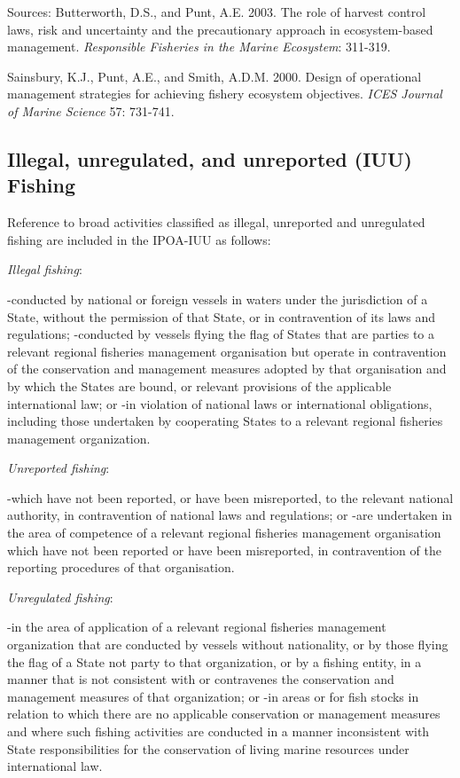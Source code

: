 \documentclass[
  11pt,
]{book}
\begin{document}
Sources: Butterworth, D.S., and Punt, A.E. 2003. The role of harvest control laws, risk and uncertainty and the precautionary approach in ecosystem-based management. \emph{Responsible Fisheries in the Marine Ecosystem}: 311-319.

Sainsbury, K.J., Punt, A.E., and Smith, A.D.M. 2000. Design of operational management strategies
for achieving fishery ecosystem objectives. \emph{ICES Journal of Marine Science} 57: 731-741.

\hypertarget{illegal-unregulated-and-unreported-iuu-fishing}{%
\subsection{Illegal, unregulated, and unreported (IUU) Fishing}\label{illegal-unregulated-and-unreported-iuu-fishing}}

Reference to broad activities classified as illegal, unreported and unregulated fishing are included in the IPOA-IUU as follows:

\emph{Illegal fishing}:

-conducted by national or foreign vessels in waters under the jurisdiction of a State, without the permission of that State, or in contravention of its laws and regulations;
-conducted by vessels flying the flag of States that are parties to a relevant regional fisheries management organisation but operate in contravention of the conservation and management measures adopted by that organisation and by which the States are bound, or relevant provisions of the applicable international law; or
-in violation of national laws or international obligations, including those undertaken by cooperating States to a relevant regional fisheries management organization.

\emph{Unreported fishing}:

-which have not been reported, or have been misreported, to the relevant national authority, in contravention of national laws and regulations; or
-are undertaken in the area of competence of a relevant regional fisheries management organisation which have not been reported or have been misreported, in contravention of the reporting procedures of that organisation.

\emph{Unregulated fishing}:

-in the area of application of a relevant regional fisheries management organization that are conducted by vessels without nationality, or by those flying the flag of a State not party to that organization, or by a fishing entity, in a manner that is not consistent with or contravenes the conservation and management measures of that organization; or
-in areas or for fish stocks in relation to which there are no applicable conservation or management measures and where such fishing activities are conducted in a manner inconsistent with State responsibilities for the conservation of living marine resources under international law.
\end{document}
